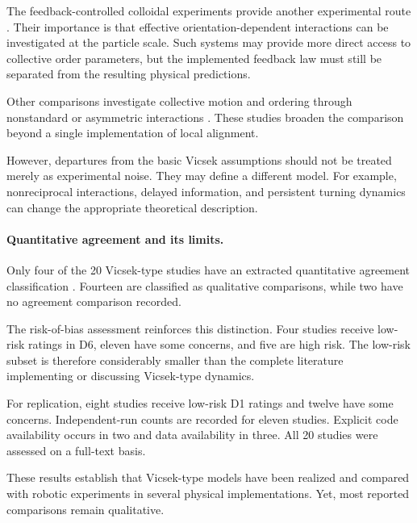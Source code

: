 The feedback-controlled colloidal experiments
provide another experimental route
\cite{Chen2024synchronousandfull,Chen2022collectiveresponse,Chen2024persistentandrespo}.
Their importance is that effective
orientation-dependent interactions can
be investigated at the particle scale.
Such systems may provide more direct
access to collective order parameters,
but the implemented feedback law
must still be separated from
the resulting physical predictions.

Other comparisons investigate collective
motion and ordering through nonstandard
or asymmetric interactions
\cite{Fruchart2021nonreciprocalphase,Giomi2013swarmingswirlinga,Liu2025collectivemotionmo}.
These studies broaden the comparison
beyond a single implementation of
local alignment.

However, departures from the basic
Vicsek assumptions should not be
treated merely as experimental noise.
They may define a different model.
For example, nonreciprocal interactions,
delayed information, and persistent
turning dynamics can change the
appropriate theoretical description.

\paragraph*{Quantitative agreement and its limits.}

Only four of the 20 Vicsek-type studies
have an extracted quantitative agreement
classification
\cite{Chen2024synchronousandfull,Xiao2023perceptionofmotion,Dizenhaus2026anonymousleadership,Chen2024persistentandrespo}.
Fourteen are classified as qualitative
comparisons, while two have no
agreement comparison recorded.

The risk-of-bias assessment reinforces
this distinction. Four studies receive
low-risk ratings in D6, eleven have
some concerns, and five are high risk.
The low-risk subset is therefore
considerably smaller than the complete
literature implementing or discussing
Vicsek-type dynamics.

For replication, eight studies
receive low-risk D1 ratings and
twelve have some concerns.
Independent-run counts are recorded
for eleven studies. Explicit code
availability occurs in two and
data availability in three.
All 20 studies were assessed
on a full-text basis.

These results establish that Vicsek-type
models have been realized and compared
with robotic experiments in several
physical implementations. Yet, most
reported comparisons remain qualitative.

